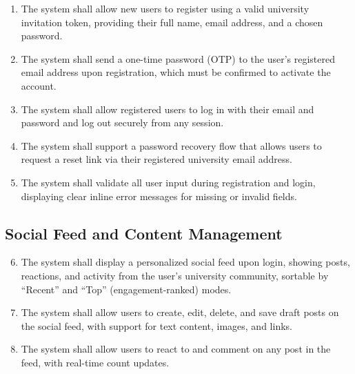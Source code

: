 \documentclass[12pt, a4paper]{article}
\begin{document}
\begin{enumerate}[label=\textbf{FR-\arabic*:}, leftmargin=*, align=left]

    \item The system shall allow new users to register using a valid university
    invitation token, providing their full name, email address, and a chosen password.

    \item The system shall send a one-time password (OTP) to the user's registered
    email address upon registration, which must be confirmed to activate the account.

    \item The system shall allow registered users to log in with their email and
    password and log out securely from any session.

    \item The system shall support a password recovery flow that allows users to
    request a reset link via their registered university email address.

    \item The system shall validate all user input during registration and login,
    displaying clear inline error messages for missing or invalid fields.

\end{enumerate}

\subsection{Social Feed and Content Management}

\begin{enumerate}[label=\textbf{FR-\arabic*:}, leftmargin=*, align=left]
\setcounter{enumi}{5}

    \item The system shall display a personalized social feed upon login, showing
    posts, reactions, and activity from the user's university community, sortable
    by ``Recent'' and ``Top'' (engagement-ranked) modes.

    \item The system shall allow users to create, edit, delete, and save draft posts
    on the social feed, with support for text content, images, and links.

    \item The system shall allow users to react to and comment on any post in the
    feed, with real-time count updates.

\end{enumerate}
\end{document}
